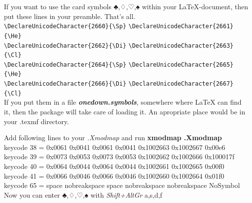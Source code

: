 \documentclass[onedown-examples]{subfiles}
\begin{document}
\noindent
\begin{tcolorbox}[colback=red!5!white,colframe=red!75!black,
                  title={Use card symbols like {\setdefaults{colors=b+w}♣,♢,♡,♠} directly as input}]
If you want to use the card symbols {♣,♢,♡,♠} within your \LaTeX-document,
then put these lines in your preamble. That's all.
\\[0.3em]
\verb|\DeclareUnicodeCharacter{2660}{\Sp}|
\verb|\DeclareUnicodeCharacter{2661}{\He}| \\
\verb|\DeclareUnicodeCharacter{2662}{\Di}|
\verb|\DeclareUnicodeCharacter{2663}{\Cl}| \\
\verb|\DeclareUnicodeCharacter{2664}{\Sp}|
\verb|\DeclareUnicodeCharacter{2665}{\He}| \\
\verb|\DeclareUnicodeCharacter{2666}{\Di}|
\verb|\DeclareUnicodeCharacter{2667}{\Cl}| \\[0.3em]

If you put them in a file \textbf{\emph{onedown.symbols}}, somewhere where
\LaTeX{} can find it, then the \OneDown package will take care of loading it. An
apropriate place would be in your .texmf directory.
\end{tcolorbox}
\begin{tcolorbox}[colback=red!5!white,colframe=red!75!black,
                  title={To enter these card symbols on your keyboard, use this with Linux}]
Add following lines to your \emph{.Xmodmap} and run \textbf{xmodmap .Xmodmap}
\\[0.3em]
{\ttfamily
keycode 38 = 0x0061 0x0041 0x0061 0x0041 0x1002663 0x1002667 0x00e6 \\
keycode 39 = 0x0073 0x0053 0x0073 0x0053 0x1002662 0x1002666 0x100017f \\
keycode 40 = 0x0064 0x0044 0x0064 0x0044 0x1002661 0x1002665 0x00f0 \\
keycode 41 = 0x0066 0x0046 0x0066 0x0046 0x1002660 0x1002664 0x01f0 \\
keycode 65 = space nobreakspace space nobreakspace nobreakspace NoSymbol \\
}
\tcblower
Now you can enter {♣,♢,♡,♠} with \emph{Shift+AltGr} a,s,d,f
\end{tcolorbox}
\end{document}
